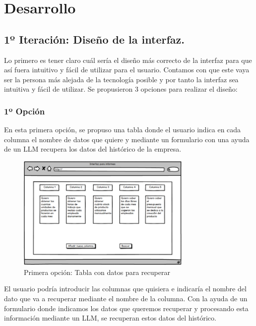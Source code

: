 \chapter{Desarrollo}
\label{chap:Desarrollo}

\section{1º Iteración: Diseño de la interfaz.}

Lo primero es tener claro cuál sería el diseño más correcto de la interfaz para que así fuera intuitivo 
y fácil de utilizar para el usuario. Contamos con que este vaya ser la persona más alejada de la tecnología posible 
y por tanto la interfaz sea intuitiva y fácil de utilizar. Se propusieron 3 opciones para realizar el diseño:

\subsection{1º Opción}

En esta primera opción, se propuso una tabla donde el usuario indica en cada columna el nombre de datos que quiere 
y mediante un formulario con una ayuda de un LLM recupera los datos del histórico de la empresa.

\begin{figure}[hp!]
    \centering
    \includegraphics[width=0.75\textwidth]{imaxes/iteracion1.1.png}
    \caption{Primera opción: Tabla con datos para recuperar}
    \label{fig:iteracion1.1}
\end{figure}

El usuario podría introducir las columnas que quisiera e indicaría el nombre del dato que va a recuperar mediante el nombre de la columna. 
Con la ayuda de un formulario donde indicamos los datos que queremos recuperar y procesando esta información mediante un LLM, 
se recuperan estos datos del histórico.

